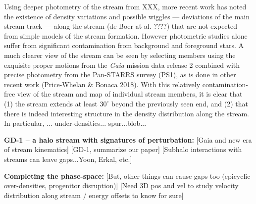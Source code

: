 \documentclass[12pt]{article}
\begin{document}
Using deeper photometry of the stream from XXX, more recent work has noted the existence of density variations and possible wiggles --- deviations of the main stream track --- along the stream (de Boer at al. ????) that are not expected from simple models of the stream formation.
However photometric studies alone suffer from significant contamination from background and foreground stars.
A much clearer view of the stream can be seen by selecting members using the exquisite proper motions from the \textit{Gaia} mission data release 2 combined with precise photometry from the Pan-STARRS survey (PS1), as is done in other recent work (Price-Whelan \& Bonaca 2018).
With this relatively contamination-free view of the stream and map of individual stream members, it is clear that (1) the stream extends at least $30^\circ$ beyond the previously seen end, and (2) that there is indeed interesting structure in the density distribution along the stream.
In particular, ... under-densities... spur...blob...


{\bf GD-1 -- a halo stream with signatures of perturbation:}
[Gaia and new era of stream kinematics]
[GD-1, summarize our paper]
[Subhalo interactions with streams can leave gaps...Yoon, Erkal, etc.]


{\bf Completing the phase-space:}
[But, other things can cause gaps too (epicyclic over-densities, progenitor disruption)]
[Need 3D pos and vel to study velocity distribution along stream / energy offsets to know for sure]
\end{document}
